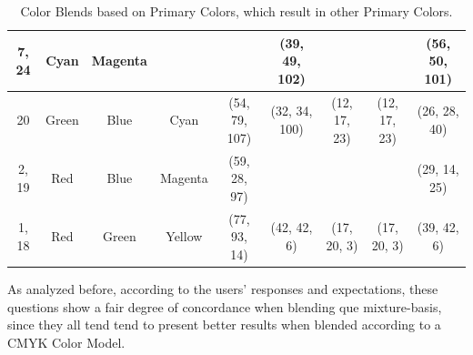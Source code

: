 \begin{table}[htbp]
{\begin{tabular}{ccccclclclclcl}
    \multicolumn{1}{c|}{7, 24}    & \multicolumn{1}{c|}{Cyan}    & \multicolumn{1}{c||}{Magenta} & \multicolumn{1}{c||}{\cellcolor[HTML]{0000FF}{\color[HTML]{FFFFFF} Blue}} & \multicolumn{2}{c||}{\cellcolor[HTML]{0000FF}{\color[HTML]{FFFFFF} (18, 7, 95)}} & \multicolumn{2}{c||}{\cellcolor[HTML]{00CAFF}(39, 49, 102)}                       & \multicolumn{2}{c||}{\cellcolor[HTML]{8080FF}{\color[HTML]{FFFFFF} (35, 27, 98)}} & \multicolumn{2}{c||}{\cellcolor[HTML]{8080FF}{\color[HTML]{FFFFFF} (35, 27, 98)}} & \multicolumn{2}{c|}{\cellcolor[HTML]{C6AEFF}(56, 50, 101)} \\ \hline \hline
    \multicolumn{1}{c|}{20}       & \multicolumn{1}{c|}{Green}   & \multicolumn{1}{c||}{Blue}    & \multicolumn{1}{c||}{\cellcolor[HTML]{00FFFF}Cyan}                        & \multicolumn{2}{c||}{\cellcolor[HTML]{00FFFF}(54, 79, 107)}                      & \multicolumn{2}{c||}{\cellcolor[HTML]{00A5FF}(32, 34, 100)}                       & \multicolumn{2}{c||}{\cellcolor[HTML]{008080}(12, 17, 23)}                        & \multicolumn{2}{c||}{\cellcolor[HTML]{008080}(12, 17, 23)}                        & \multicolumn{2}{c|}{\cellcolor[HTML]{7D93A6}(26, 28, 40)}  \\ \hline \hline
    \multicolumn{1}{c|}{2, 19}    & \multicolumn{1}{c|}{Red}     & \multicolumn{1}{c||}{Blue}    & \multicolumn{1}{c||}{\cellcolor[HTML]{FF00FF}Magenta}                     & \multicolumn{2}{c||}{\cellcolor[HTML]{FF00FF}(59, 28, 97)}                       & \multicolumn{2}{c||}{\cellcolor[HTML]{FB0080}{\color[HTML]{FFFFFF} (44, 22, 22)}} & \multicolumn{2}{c||}{\cellcolor[HTML]{800080}{\color[HTML]{FFFFFF} (13, 6, 21)}}  & \multicolumn{2}{c||}{\cellcolor[HTML]{800080}{\color[HTML]{FFFFFF} (13, 6, 21)}}  & \multicolumn{2}{c|}{\cellcolor[HTML]{CA0088}(29, 14, 25)}  \\ \hline \hline
    \multicolumn{1}{c|}{1, 18}    & \multicolumn{1}{c|}{Red}     & \multicolumn{1}{c||}{Green}   & \multicolumn{1}{c||}{\cellcolor[HTML]{FFFF00}Yellow}                      & \multicolumn{2}{c||}{\cellcolor[HTML]{FFFF00}(77, 93, 14)}                       & \multicolumn{2}{c||}{\cellcolor[HTML]{D7A700}(42, 42, 6)}                         & \multicolumn{2}{c||}{\cellcolor[HTML]{808000}(17, 20, 3)}                         & \multicolumn{2}{c||}{\cellcolor[HTML]{808000}(17, 20, 3)}                         & \multicolumn{2}{c|}{\cellcolor[HTML]{C9AB00}(39, 42, 6)}   \\ \hline
  \end{tabular}}
  \caption[Color Blends based on Primary Colors, which result in other Primary Colors.]{Color Blends based on Primary Colors, which result in other Primary Colors.}
  \label{table:primary_blends}
\end{table}
%
As analyzed before, according to the users' responses and expectations, these questions show a fair degree of concordance when blending que mixture-basis, since they all tend tend to present better results when
blended according to a CMYK Color Model.


